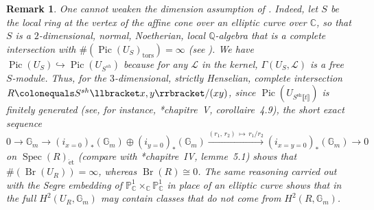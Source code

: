 \documentclass[11pt, reqno]{amsart}
\newcommand{\bC}{\mathbb{C}}
\newcommand{\bG}{\mathbb{G}}
\newcommand{\bP}{\mathbb{P}}
\newcommand{\bQ}{\mathbb{Q}}
\newcommand{\fm}{\mathfrak{m}}
\newcommand{\sL}{\mathscr{L}}
\DeclareMathOperator{\Br}{Br}			%
\DeclareMathOperator{\Pic}{Pic}		%
\DeclareMathOperator{\Spec}{Spec}		%
\newcommand{\ce}{\colonequals}
\newcommand{\et}{\mathrm{\acute{e}t}}	%
\newcommand{\hra}{\hookrightarrow}
\newcommand{\llb}{\llbracket}			%
\newcommand{\ra}{\rightarrow}
\newcommand{\rrb}{\rrbracket}			%
\newcommand{\sh}{\mathrm{sh}}		%
\newcommand{\tors}{\mathrm{tors}}		%
\newcommand{\xra}{\xrightarrow}
\newcommand{\be}{\begin{equation}}
\newcommand{\ee}{\end{equation}}
\newcommand{\brem}{\begin{rem}}
\newcommand{\erem}{\end{rem}}
\numberwithin{equation}{numberingbase}
\theoremstyle{thms}
\theoremstyle{claims}
\theoremstyle{defs}
\newtheorem{rem}[numberingbase]{Remark}
\theoremstyle{thms}
\theoremstyle{defs}
\theoremstyle{subsection-tweak}
\theoremstyle{subsection-tweak}
\begin{document}


\brem
One cannot weaken the dimension assumption of . Indeed, let $S$ be the local ring at the vertex of the affine cone over an elliptic curve over $\bC$, so that $S$ is a $2$-dimensional, normal, Noetherian, local $\bQ$-algebra that is a complete intersection with $\#(\Pic(U_S)_\tors) = \infty$ (see ). We have  $\Pic(U_S) \hra \Pic(U_{S^{sh}})$ because for any $\sL$ in the kernel, $\Gamma(U_S, \sL)$ is a free $S$-module. Thus, for the $3$-dimensional, strictly Henselian, complete intersection $R \ce S^{sh}\llb x, y\rrb/(xy)$, since $\Pic(U_{S^\sh\llb t \rrb})$ is finitely generated (see, for instance, \cite{Bou78}*{chapitre~V, corollaire~4.9}), the short exact sequence
\[%
0 \ra \bG_m \ra (i_{x = 0})_*(\bG_m) \oplus (i_{y = 0})_*(\bG_m) \xra{(r_1,\, r_2)\, \mapsto\, r_1/r_2} (i_{x = y = 0})_*(\bG_m) \ra 0
\]
on $\Spec(R)_\et$ (compare with \cite{Bou78}*{chapitre~IV, lemme~5.1}) shows that $\#(\Br(U_R)) = \infty$, whereas  $\Br(R) \cong 0$. The same reasoning carried out with the Segre embedding of $\bP^1_\bC \times_\bC \bP^1_\bC$ in place of an elliptic curve shows that in  the full $H^2(U_R, \bG_m)$ may contain classes that do not come from $H^2(R, \bG_m)$.
\erem


\end{document}
